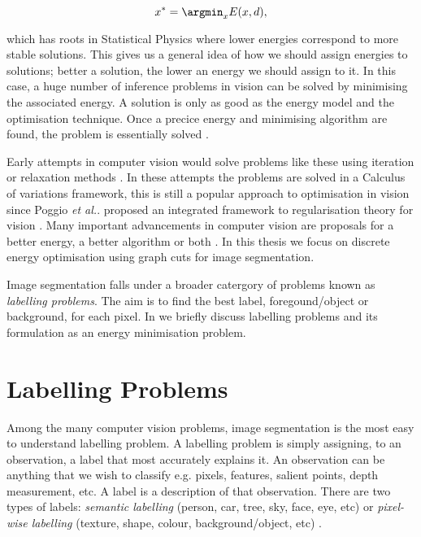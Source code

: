 \begin{equation}
	x^{*} = \argmin_{x}E(x,d),
	\label{eq:gibbsenergy}
\end{equation}

which has roots in Statistical Physics where lower energies correspond to more stable solutions.
This gives us a general idea of how we should assign energies to solutions; better a solution, the lower an energy we should assign to it.
In this case, a huge number of inference problems in vision can be solved by minimising the associated energy.
A solution is only as good as the energy model and the optimisation technique. Once a precice energy and minimising algorithm are found, the problem is essentially solved \citep{Delong2011}. 

Early attempts in computer vision would solve problems like these using iteration or relaxation methods \citep{Waltz1975,Rosenfeld1976}.
In these attempts the problems are solved in a Calculus of variations framework, this is still a popular approach to optimisation in vision since Poggio \textit{et al.}. \citep{Poggio1985} proposed an integrated framework to regularisation theory for vision \citep{Sakaue1999}.
Many important advancements in computer vision are proposals for a better energy, a better algorithm or both \citep{Delong2011,Boykov2001,Kolmogorov2005,Mumford1989,Shi1997}.
In this thesis we focus on discrete energy optimisation using graph cuts for image segmentation.

Image segmentation falls under a broader catergory of problems known as \textit{labelling problems}.
The aim is to find the best label, foregound/object or background, for each pixel.
In  we briefly discuss labelling problems and its formulation as an energy minimisation problem.


\section{Labelling Problems}
\label{sec:LabellingProblems}

Among the many computer vision problems, image segmentation is the most easy to understand labelling problem.
A labelling problem is simply assigning, to an observation, a label that most accurately explains it.
An observation can be anything that we wish to classify e.g. pixels, features, salient points, depth measurement, etc.
A label is a description of that observation.
There are two types of labels: \textit{semantic labelling} (person, car, tree, sky, face, eye, etc) or \textit{pixel-wise labelling} (texture, shape, colour, background/object, etc) \citep{Delong2011,Athanasiadis2007}.

